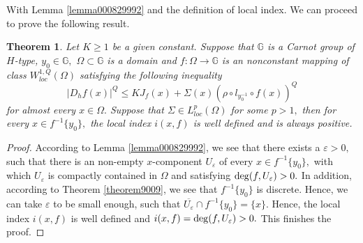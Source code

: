 \documentclass[11pt,twoside]{article}
\newtheorem{thm}{Theorem}[section]
\theoremstyle{definition}
\theoremstyle{remark}
\begin{document}
With Lemma \ref{lemma000829992} and the definition of local index. We can proceed to prove the following result.
\begin{thm}\label{900177}
 Let  $K\geq1$ be a given constant. Suppose that $\mathbb{G}$ is a Carnot group of $H$-type,  $y_{0}\in\mathbb{G},$ $\Omega\subset\mathbb{G}$ is a domain and $f:\Omega\rightarrow \mathbb{G}$ is an nonconstant mapping of class $W_{loc}^{1,Q}(\Omega)$ satisfying  the following inequality
$$\vert D_{h}f(x)\vert^{Q}\leq KJ_{f}(x)+\Sigma(x)(\rho\circ l_{y_{0}^{-1}}\circ f(x))^{Q}$$
for almost every $x\in\Omega.$ Suppose that $\Sigma\in L_{loc}^{p}(\Omega)$ for some $p>1,$ then for every $x\in f^{-1}\{y_{0}\},$ the local index $i(x,f)$ is well defined and is always positive.
\end{thm}
\begin{proof}
According to Lemma \ref{lemma000829992}, we see that there exists a $\varepsilon>0,$ such that there is an non-empty $x$-component $U_{\varepsilon}$ of every $x\in f^{-1}\{y_{0}\},$  with which $U_{\varepsilon}$ is compactly contained in $\Omega$ and satisfying ${\rm deg}(f,U_{\varepsilon})>0.$ In addition, according to Theorem \ref{theorem9009},  we see that $f^{-1}\{y_{0}\}$ is discrete.
 Hence, we can take $\varepsilon$ to be small enough, such that $\overline{U_{\varepsilon}}\cap f^{-1}\{y_{0}\}=\{x\}.$ Hence, the local index $i(x,f)$ is well defined and $i(x,f)={\rm deg}(f,U_{\varepsilon})>0.$ This finishes the proof.
\end{proof}
\end{document}
